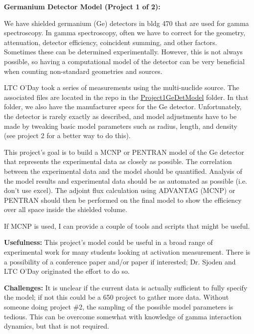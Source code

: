 \documentclass[12pt, answers]{exam}
\begin{document}
\begin{questions}
\question \textbf{Germanium Detector Model (Project 1 of 2):}

We have shielded germanium (Ge) detectors in bldg 470 that are used for gamma spectroscopy.  
In gamma spectroscopy, often we have to correct for the geometry, attenuation, detector efficiency, coincident summing, and other factors.  
Sometimes these can be determined experimentally.  
However, this is not always possible, so having a computational model of the detector can be very beneficial when counting non-standard geometries and sources.

LTC O'Day took a series of measurements using the multi-nuclide source.  
The associated files are located in the repo in the \href{https://github.com/jamesbevins/NENG685/Projects/Project1_GeDetModel}{Project1\textunderscore GeDetModel} folder. 
In that folder, we also have the manufacturer specs for the Ge detector.
Unfortunately, the detector is rarely exactly as described, and model adjustments have to be made by tweaking basic model parameters such as radius, length, and density (see project 2 for a better way to do this).

This project's goal is to build a MCNP or PENTRAN model of the Ge detector that represents the experimental data as closely as possible.  
The correlation between the experimental data and the model should be quantified.  
Analysis of the model results and experimental data should be as automated as possible (i.e. don't use excel). 
The adjoint flux calculation using ADVANTAG (MCNP) or PENTRAN should then be performed on the final model to show the efficiency over all space inside the shielded volume.

If MCNP is used, I can provide a couple of tools and scripts that might be useful.  

\textbf{Usefulness:} 
This project's model could be useful in a broad range of experimental work for many students looking at activation measurement.  
There is a possibility of a conference paper and/or paper if interested; Dr. Sjoden and LTC O'Day originated the effort to do so.

\textbf{Challenges:}
It is unclear if the current data is actually sufficient to fully specify the model; if not this could be a 650 project to gather more data.  
Without someone doing project \#2, the sampling of the possible model parameters is tedious.  
This can be overcome somewhat with knowledge of gamma interaction dynamics, but that is not required. 


\end{questions}
\end{document}
